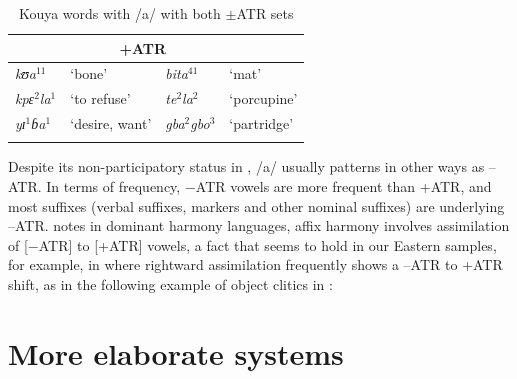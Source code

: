 \documentclass[output=paper,newtxmath,modfonts,nonflat]{langsci/langscibook}
\begin{document}
\begin{table}
\caption{Kouya words with /a/ with both $\pm$ATR sets}
\label{tab:zogbo:2b}
  
\begin{tabular}{llll}

\lsptoprule
\multicolumn{2}{c}{−ATR} & \multicolumn{2}{c}{+ATR} \\
\midrule
\textit{kʊa}$^{11}$ & ‘bone’ & \textit{bita}$^{41}$ & ‘mat’ \\

\textit{{kp}ɛ}$^2$\textit{{l}a}$^1$ & {‘to refuse’} & \textit{te}$^2$\textit{la}$^2$ & ‘porcupine’ \\

\textit{yɪ}$^1$\textit{ɓa}$^1$ & ‘desire, want’ & \textit{gba}$^2$\textit{gbo}$^3$ & ‘partridge’ \\ 
\lspbottomrule
\end{tabular}
\end{table}

  
Despite its non-participatory status in , /a/ usually patterns in other ways as –ATR. In terms of frequency, −ATR vowels are more frequent than +ATR, and most suffixes (verbal suffixes,  markers and other nominal suffixes) are underlying –ATR. \citet{Casali2008} notes in dominant harmony languages, affix harmony involves assimilation of [$-$ATR] to [+ATR] vowels, a fact that seems to hold in our Eastern  samples, for example, in  where rightward assimilation frequently shows a –ATR to +ATR shift, as in the following example of object clitics in :


\ea
    \label{ex:zogbo:3}
		 \citep{Marchese1975}
    \z






\section{More elaborate systems}\label{sec:zogbo:2} 
\end{document}
